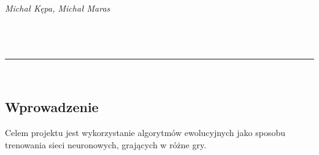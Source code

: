 \documentclass[polish]{article}
\newcommand{\ThinRule}{\noindent\rule{\linewidth}{0.4pt}}
\begin{document}
    \begin{roboto}

    \begin{center}
    
    \textit{\Large Michał Kępa,  Michał Maras}\\[0.5cm]

    \text{\bfseries \huge \textcolor{ao}{Algorytmy ewolucyjne} }\\[0.2cm]
    \text{\Large \textcolor{calpolypomonagreen}{Neuroewolucja w grach}}
    \\[0.7cm]
    
    \\[0.2cm]
    \ThinRule\\[0.75cm]
    \end{center}

    \end{roboto}
    
    \begin{roboto}
    \section{\textbf{\textcolor{calpolypomonagreen}{Wprowadzenie}}}
    
    Celem projektu jest wykorzystanie algorytmów ewolucyjnych jako sposobu trenowania sieci neuronowych,
    grających w różne gry. 
    



 
    \end{roboto}
\end{document}
